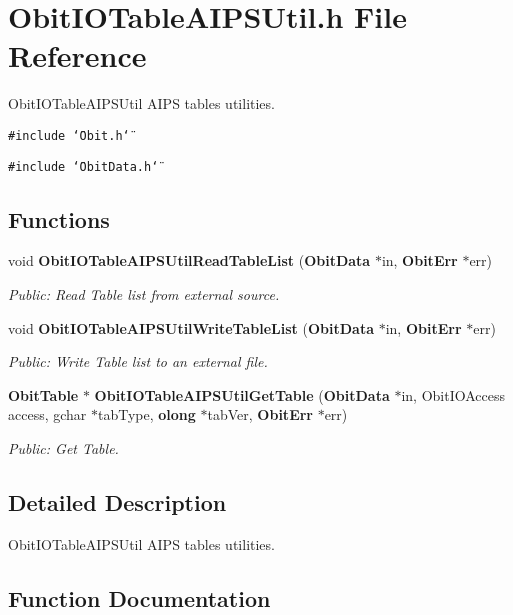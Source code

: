 \section{Obit\-IOTable\-AIPSUtil.h File Reference}
\label{ObitIOTableAIPSUtil_8h}
Obit\-IOTable\-AIPSUtil AIPS tables utilities. 

{\tt \#include \char`\"{}Obit.h\char`\"{}}\par
{\tt \#include \char`\"{}Obit\-Data.h\char`\"{}}\par
\subsection*{Functions}
\begin{CompactItemize}
\item 
void {\bf Obit\-IOTable\-AIPSUtil\-Read\-Table\-List} ({\bf Obit\-Data} $\ast$in, {\bf Obit\-Err} $\ast$err)
\begin{CompactList}\small\item\em Public: Read Table list from external source. \item\end{CompactList}\item 
void {\bf Obit\-IOTable\-AIPSUtil\-Write\-Table\-List} ({\bf Obit\-Data} $\ast$in, {\bf Obit\-Err} $\ast$err)
\begin{CompactList}\small\item\em Public: Write Table list to an external file. \item\end{CompactList}\item 
{\bf Obit\-Table} $\ast$ {\bf Obit\-IOTable\-AIPSUtil\-Get\-Table} ({\bf Obit\-Data} $\ast$in, Obit\-IOAccess access, gchar $\ast$tab\-Type, {\bf olong} $\ast$tab\-Ver, {\bf Obit\-Err} $\ast$err)
\begin{CompactList}\small\item\em Public: Get Table. \item\end{CompactList}\end{CompactItemize}


\subsection{Detailed Description}
Obit\-IOTable\-AIPSUtil AIPS tables utilities. 



\subsection{Function Documentation}

